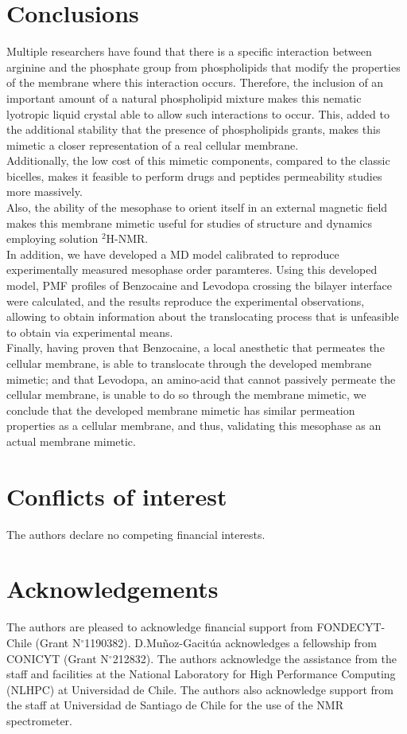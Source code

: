 \documentclass[3p,preprint,review]{elsarticle}
\begin{document}
	\section{Conclusions}
	Multiple researchers\cite{Aliaga2011,Hristova2011} have found
	that there is a specific interaction between arginine and the phosphate group
	from
	phospholipids
	that modify the properties of the membrane where this interaction occurs.
	Therefore, the inclusion of an important amount of a natural phospholipid
	mixture makes this nematic lyotropic liquid crystal able to allow such
	interactions to occur. This, added to the additional stability that the
  presence of phospholipids grants, makes this mimetic a closer representation of a real
	cellular membrane.\\
	Additionally, the low cost of this mimetic components, compared to the classic
	bicelles, makes it feasible to perform drugs and peptides permeability studies
	more massively.\\
	Also, the ability of the mesophase to orient itself in an external magnetic
	field
	makes this membrane mimetic useful for studies of structure and dynamics
	employing solution
	$^2$H-NMR.\\
	In addition, we have developed a MD model calibrated to reproduce
	experimentally measured mesophase order paramteres. Using this developed model,
	PMF profiles of Benzocaine and Levodopa crossing the bilayer interface were
	calculated, and the results reproduce the experimental observations, allowing to
	obtain information about the translocating process that is	unfeasible to obtain
	via experimental means.\\
	Finally, having proven that Benzocaine, a local anesthetic that permeates
	the cellular membrane, is able to translocate through the developed membrane
	mimetic; and that Levodopa, an amino-acid that cannot passively permeate the
	cellular membrane, is unable to do so through the membrane
	mimetic, we conclude that the developed membrane mimetic has
	similar permeation properties as a cellular membrane, and thus, validating this
	mesophase as an actual
	membrane mimetic.\\
	
	
	\section*{Conflicts of interest}
	The authors declare no competing financial interests.
	
	\section*{Acknowledgements}
	The authors are pleased to acknowledge financial support from FONDECYT-Chile
	(Grant N$^\circ$1190382). D.Muñoz-Gacitúa acknowledges a fellowship from
	CONICYT
	(Grant N$^\circ$212832). The authors acknowledge the assistance from the
	staff and facilities at the National Laboratory for High Performance Computing
	(NLHPC) at Universidad de Chile. The authors also acknowledge support from the
	staff at Universidad de Santiago de Chile for the use of the NMR spectrometer.
	
\end{document}
